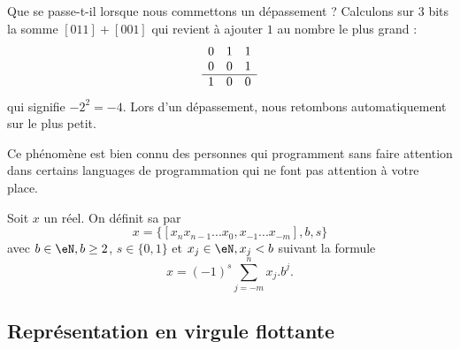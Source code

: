 \begin{normaltext}[Le dépassement]
    Que se passe-t-il lorsque nous commettons un dépassement ? Calculons sur \( 3\) bits la somme \( [011]+[001]\) qui revient à ajouter \( 1\) au nombre le plus grand :
    \begin{equation*}
        \begin{array}[]{ccc}
            0&1&1\\
            0&0&1\\
            \hline
            1&0&0\\
        \end{array}
    \end{equation*}
    qui signifie \( -2^2=-4\). Lors d'un dépassement, nous retombons automatiquement sur le plus petit.

    Ce phénomène est bien connu des personnes qui programment sans faire attention dans certains languages de programmation qui ne font pas attention à votre place.
\end{normaltext}


\begin{definition}
	Soit $x$ un réel. On définit sa  par
	\begin{equation}
		x=\{[x_nx_{n-1}...x_0,x_{-1}...x_{-m}], b, s\}
	\end{equation}
	avec  $b\in\eN, b\geq2$, $s\in\{0,1\}$ et $x_j\in\eN,x_j<b$ suivant la formule
	\begin{equation}
		x=(-1)^{s}\sum_{j=-m}^nx_j.b^j.
	\end{equation}
\end{definition}

\subsection{Représentation en virgule flottante}

